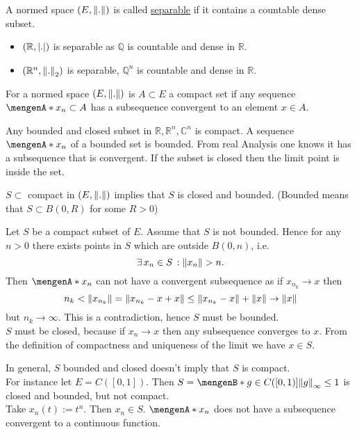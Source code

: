 \begin{definition*}[separable]
	A normed space $(E,\norm{.})$ is called \underline{separable} if it contains a countable dense subset.
\end{definition*}
\begin{beispiele}
	\begin{itemize}
		\item $(\mathbb{R},\lvert.\rvert)$ is separable as $\mathbb{Q}$ is countable and dense in $\mathbb{R}$.
		\item $(\mathbb{R}^n,\norm{.}_2)$ is separable, $\mathbb{Q}^n$ is countable and dense in $\mathbb{R}$.
	\end{itemize}
\end{beispiele}
\begin{definition*}
	For a normed space $(E,\norm{.})$ is $A \subset E$ a compact set if any sequence $\set{x_n} \subset A$ has a subsequence convergent to an element $x \in A$.
\end{definition*}
\begin{beispiel}
	 Any bounded and closed subset in $\mathbb{R}, \mathbb{R}^n, \mathbb{C}^n$ is compact. A sequence $\set{x_n}$ of a bounded set is bounded. From real Analysis one knows it has a subsequence that is convergent. If the subset is closed then the limit point is inside the set. 
\end{beispiel}
\begin{lemma*}
	$S \subset$ compact in $(E, \norm{.})$ implies that $S$ is closed and bounded. (Bounded means that $S \subset B(0,R)$ for some $R>0$)
\end{lemma*}
\begin{beweis}
	Let $S$ be a compact subset of $E$. Assume that $S$ is not bounded. Hence for any $n >0$ there exists points in $S$ which are outside $B(0,n)$, i.e. 
	\[
		\exists\, x_n \in S \,: \norm{x_n} >n.
	\]
	Then $\set{x_n}$ can not have a convergent subsequence as if $x_{n_k} \to x$ then
	\[
		n_k < \norm{x_{n_k}} = \norm{x_{n_k}-x + x} \leq \norm{x_{n_k}-x} + \norm{x} \to \norm{x}
	\]
	but $n_k \to \infty$. This is a contradiction, hence $S$ must be bounded. \\ $S$ must be closed, because if $x_n \to x$ then any subsequence converges to $x$. From the definition of compactness and uniqueness of the limit we have $x \in S$. \\
\end{beweis}
\begin{bemerkung}
	In general, $S$ bounded and closed doesn't imply that $S$ is compact. \\
For instance let $E= C([0,1])$. Then $S=\set[g \in C([0,1])]{\norm{g}_{\infty}\leq 1}$ is closed and bounded, but not compact. \\
Take $x_n(t):=t^n$. Then $x_n \in S$. $\set{x_n}$ does not have a subsequence convergent to a continuous function.
\end{bemerkung}
